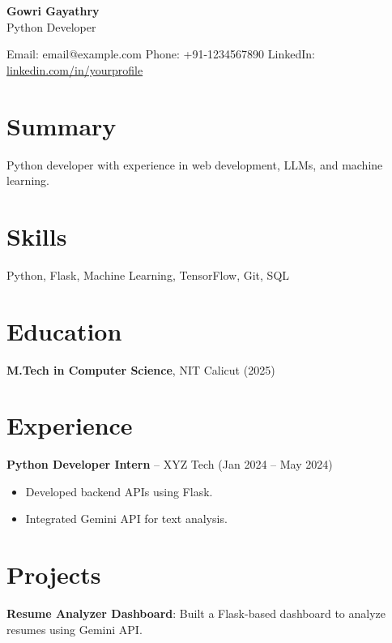\documentclass{article}
\begin{document}
\begin{center}\textbf{\Huge Gowri Gayathry}\\
Python Developer\\\end{center}
\noindent
Email: email@example.com \quad Phone: +91-1234567890 \quad LinkedIn: \url{linkedin.com/in/yourprofile}\\[0.5cm]
\section*{Summary}
Python developer with experience in web development, LLMs, and machine learning.
\section*{Skills}
Python, Flask, Machine Learning, TensorFlow, Git, SQL
\section*{Education}
\textbf{M.Tech in Computer Science}, NIT Calicut (2025)\\[0.2cm]
\section*{Experience}
\textbf{Python Developer Intern} -- XYZ Tech (Jan 2024 – May 2024)\\
\begin{itemize}
\item Developed backend APIs using Flask.
\item Integrated Gemini API for text analysis.
\end{itemize}
\section*{Projects}
\textbf{Resume Analyzer Dashboard}: Built a Flask-based dashboard to analyze resumes using Gemini API.\\[0.2cm]
\end{document}
